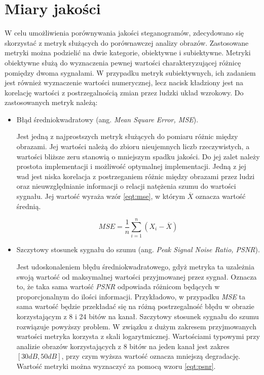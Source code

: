 {    %
    \section{Miary jakości}
    {
        W celu umożliwienia porównywania jakości steganogramów, zdecydowano się skorzystać z metryk służących do
        porównawczej analizy obrazów. Zastosowane metryki można podzielić na dwie kategorie, obiektywne i subiektywne.
        Metryki obiektywne służą do wyznaczenia pewnej wartości charakteryzującej różnicę pomiędzy dwoma sygnałami. W
        przypadku metryk subiektywnych, ich zadaniem jest również wyznaczenie wartości numerycznej, lecz nacisk
        kładziony jest na korelację wartości z postrzegalnością zmian przez ludzki układ wzrokowy. Do zastosowanych
        metryk należą:

        \begin{itemize}
            \item Błąd średniokwadratowy (ang. \textit{Mean Square Error, MSE}).

            Jest jedną z najprostszych metryk służących do pomiaru różnic między obrazami. Jej wartości należą do zbioru
            nieujemnych liczb rzeczywistych, a wartości bliższe zeru stanowią o mniejszym spadku jakości. Do jej zalet
            należy prostota implementacji i możliwość optymalnej implementacji. Jedną z jej wad jest niska korelacja z
            postrzeganiem różnic między obrazami przez ludzi oraz nieuwzględnianie informacji o relacji natężenia szumu
            do wartości sygnału. Jej wartość wyraża wzór \ref{eqt:mse}, w którym $\overline{X}$ oznacza wartość średnią.

            \begin{equation}\label{eqt:mse}
                MSE = \frac{1}{n} \sum_{i=1}^n (X_i - \overline{X})
            \end{equation}

            \item Szczytowy stosunek sygnału do szumu (ang. \textit{Peak Signal Noise Ratio, PSNR}).

            Jest udoskonaleniem błędu średniokwadratowego, gdyż metryka ta uzależnia swoją wartość od maksymalnej
            wartości przyjmowanej przez sygnał. Oznacza to, że taka sama wartość \textit{PSNR} odpowiada różnicom
            będących w proporcjonalnym do ilości informacji. Przykładowo, w przypadku \textit{MSE} ta sama wartość
            będzie przekładać się na różną postrzegalność błędu w obrazie korzystającym z 8 i 24 bitów na kanał.
            Szczytowy stosunek sygnału do szumu rozwiązuje powyższy problem. W związku z dużym zakresem przyjmowanych
            wartości metryka korzysta z skali logarytmicznej. Wartościami typowymi przy analizie obrazów korzystających
            z 8 bitów na jeden kanał jest zakres $[30dB, 50dB]$, przy czym wyższa wartość oznacza mniejszą degradację.
            Wartość metryki można wyznaczyć za pomocą wzoru \ref{eqt:psnr}.


\end{itemize}}}
